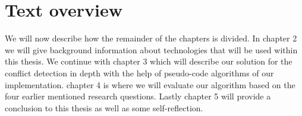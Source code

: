 \section{Text overview} \label{sec:textoverview}
We will now describe how the remainder of the chapters is divided. In chapter 2 we will give background information about technologies that will be used within this thesis. We continue with chapter 3 which will describe our solution for the conflict detection in depth with the help of pseudo-code algorithms of our implementation. chapter 4 is where we will evaluate our algorithm based on the four earlier mentioned research questions. Lastly chapter 5 will provide a conclusion to this thesis as well as some self-reflection.
\cleardoublepage
